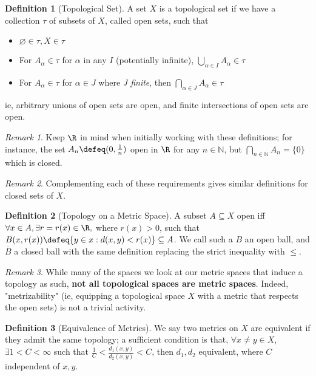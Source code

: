 \documentclass[12pt, oneside]{article}
\theoremstyle{definition}
\newtheorem{defn}{Definition}
\theoremstyle{plain}
\theoremstyle{remark}
\newtheorem{remark}{Remark}
\begin{document}
\begin{defn}[Topological Set]
  A set $X$ is a topological set if we have a collection $\tau$ of subsets of $X$, called open sets, such that \begin{itemize}
    \item $\varnothing \in \tau, X \in \tau$
    \item For $A_\alpha \in \tau$ for $\alpha$ in any $I$ (potentially infinite), $\bigcup_{\alpha \in I} A_\alpha \in \tau$
    \item For $A_\alpha \in \tau$ for $\alpha \in J$ where \emph{J finite}, then $\bigcap_{\alpha \in J} A_\alpha \in \tau$
  \end{itemize}
  ie, arbitrary unions of open sets are open, and finite intersections of open sets are open.
\end{defn}

\begin{remark}
  Keep $\R$ in mind when initially working with these definitions; for instance, the set $A_n \defeq (0, \frac{1}{n})$ open in $\R$ for any $n \in \mathbb{N}$, but $\bigcap_{n \in \mathbb{N}} A_n = \{0\}$ which is closed.
\end{remark}

\begin{remark}
  Complementing each of these requirements gives similar definitions for closed sets of $X$.
\end{remark}

\begin{defn}[Topology on a Metric Space]
  A subset $A \subseteq X$ open iff $\forall x \in A, \exists r = r(x) \in \R,$ where $r(x) > 0$, such that $B(x, r(x)) \defeq \{y \in x : d(x, y) < r(x)\} \subseteq A$. We call such a $B$ an open ball, and $\overline{B}$ a closed ball with the same definition replacing the strict inequality with $\leq$.
\end{defn}

\begin{remark}
  While many of the spaces we look at our metric spaces that induce a topology as such, \textbf{not all topological spaces are metric spaces}. Indeed, "metrizability" (ie, equipping a topological space $X$ with a metric that respects the open sets) is not a trivial activity.
\end{remark}


\begin{defn}[Equivalence of Metrics]
  We say two metrics on $X$ are equivalent if they admit the same topology; a sufficient condition is that, $\forall x \neq y \in X$, $\exists 1 < C < \infty$ such that $\frac{1}{C} < \frac{d_1(x,y)}{d_2(x,y)}< C$, then $d_1, d_2$ equivalent, where $C$ independent of $x,y$.
\end{defn}
\end{document}
